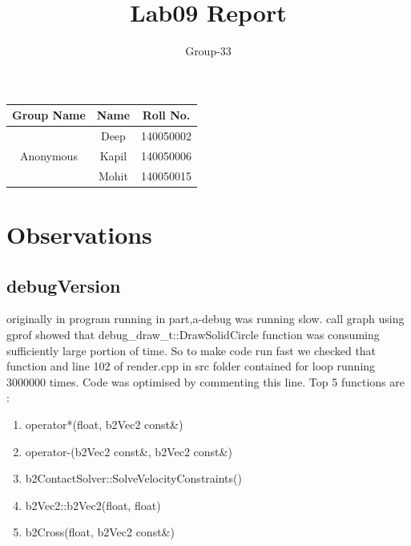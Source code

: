 \documentclass{article}
\title{Lab09 Report}
\author{ Group-33 }
\date{}
\begin{document}
\maketitle
{}

\begin{table}[h!]
\begin{center}

 \begin{tabular}{*{3}{c}}
\toprule
Group Name & Name & Roll No.\\
\midrule
\multirow{3}{*}{Anonymous} & Deep & 140050002 \\
  & Kapil & 140050006 \\
  & Mohit & 140050015 \\
\bottomrule
\end{tabular} 
 
\end{center}
\end{table}

\newpage

\section{Observations}
\subsection{debugVersion}
originally in program running in part,a-debug was running slow. call graph using gprof showed that debug\_draw\_t::DrawSolidCircle function was consuming sufficiently large portion of time. So to make code run fast we checked that function and line 102 of render.cpp in src folder contained for loop running 3000000 times. Code was optimised by commenting this line.
\newline
\newline
\newline
Top 5 functions are :
\begin{enumerate}
	\item operator*(float, b2Vec2 const\&)
	\item operator-(b2Vec2 const\&, b2Vec2 const\&)
	\item b2ContactSolver::SolveVelocityConstraints()
	\item b2Vec2::b2Vec2(float, float)
	\item b2Cross(float, b2Vec2 const\&)
\end{enumerate}
\end{document}
